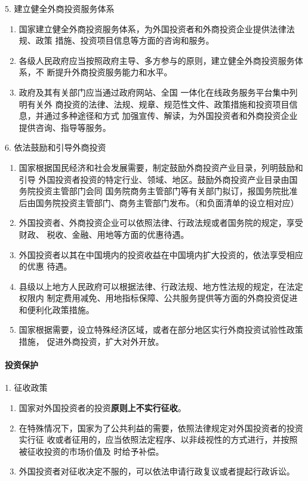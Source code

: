 \documentclass[UTF8,12pt]{ctexart}
\numberwithin{equation}{section} %
\numberwithin{figure}{section}
\numberwithin{table}{section}
\begin{document}
	5. 建立健全外商投资服务体系
	\begin{enumerate}
		\item 国家建立健全外商投资服务体系，为外国投资者和外商投资企业提供法律法规、政策 措施、投资项目信息等方面的咨询和服务。
		
		\item 各级人民政府应当按照政府主导、多方参与的原则，建立健全外商投资服务体系，不 断提升外商投资服务能力和水平。
		
		\item 政府及其有关部门应当通过政府网站、全国 一体化在线政务服务平台集中列明有关外 商投资的法律、法规、规章、规范性文件、政策措施和投资项目信息，并通过多种途径和方式 加强宣传、解读，为外国投资者和外商投资企业提供咨询、指导等服务。
	\end{enumerate}
	
	6. 依法鼓励和引导外商投资
	\begin{enumerate}
		\item 国家根据国民经济和社会发展需要，制定鼓励外商投资产业目录，列明鼓励和引导 外国投资者投资的特定行业、领域、地区。鼓励外商投资产业目录由国务院投资主管部门会同 国务院商务主管部门等有关部门拟订，报国务院批准后由国务院投资主管部门、商务主管部门发布。（和负面清单的设立相对应）
		
		\item 外国投资者、外商投资企业可以依照法律、行政法规或者国务院的规定，享受财政、 税收、金融、用地等方面的优惠待遇。
		
		\item 外国投资者以其在中国境内的投资收益在中国境内扩大投资的，依法享受相应的优惠 待遇。
		
		\item 县级以上地方人民政府可以根据法律、行政法规、地方性法规的规定，在法定权限内 制定费用减免、用地指标保障、公共服务提供等方面的外商投资促进和便利化政策措施。
		
		\item 国家根据需要，设立特殊经济区域，或者在部分地区实行外商投资试验性政策措施， 促进外商投资，扩大对外开放。
	\end{enumerate}
	
	\paragraph{投资保护}
	1. 征收政策
	\begin{enumerate}
		\item 国家对外国投资者的投资\textbf{原则上不实行征收}。
		
		\item 在特殊情况下，国家为了公共利益的需要，依照法律规定对外国投资者的投资实行征 收或者征用的，应当依照法定程序、以非歧视性的方式进行，并按照被征收投资的市场价值及 时给予补偿。
		
		\item 外国投资者对征收决定不服的，可以依法申请行政复议或者提起行政诉讼。
	\end{enumerate}
	
\end{document}
